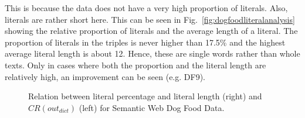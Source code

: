This is because the data does not have a very high proportion of literals. Also, literals are rather short here. This can be seen in Fig.~\ref{fig:dogfoodliteralanalysis} showing the relative proportion of literals and the average length of a literal. The proportion of literals in the triples is never higher than 17.5\% and the highest average literal length is about 12. Hence, these are single words rather than whole texts. Only in cases where both the proportion and the literal length are relatively high, an improvement can be seen (e.g. DF9).


\begin{figure}[h]
	\centering
	\hfill
	\caption{Relation between literal percentage and literal length (right) and $CR(out_{dict})$ (left) for Semantic Web Dog Food Data.}
	\label{fig:dogfood}
\end{figure}

